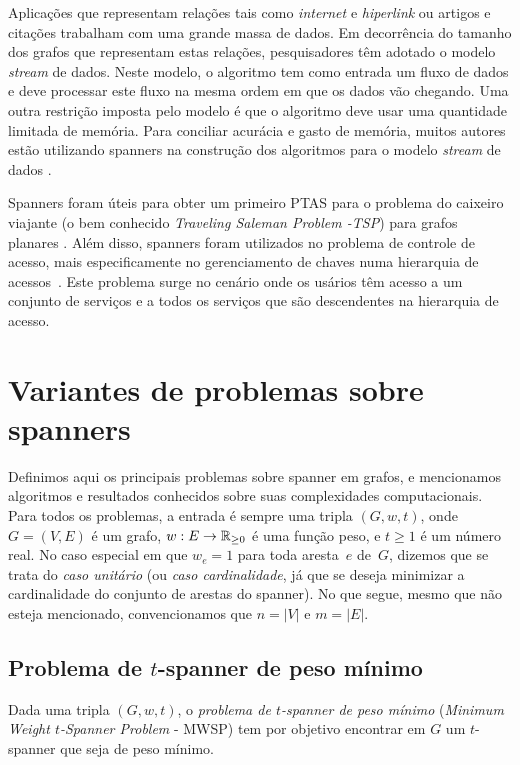 Aplicações que representam relações tais como \emph{internet} e \emph{hiperlink} ou artigos e citações trabalham com uma grande massa de dados.  Em decorrência do tamanho dos grafos que representam estas relações, pesquisadores têm adotado o modelo \emph{stream} de dados. Neste modelo, o algoritmo tem como entrada um fluxo de dados e deve processar este fluxo na mesma ordem em que os dados vão chegando. Uma outra restrição imposta pelo modelo é que o algoritmo deve usar uma quantidade limitada de memória. Para conciliar acurácia e gasto de memória, muitos autores estão utilizando spanners na construção dos algoritmos para o modelo \emph{stream} de dados \cite{AhnGM2012,CrouchMS2013,McGregor2014,KapralovW2014,ElkinS2016,
  BeckerKKL2017}.

Spanners foram úteis para obter um primeiro PTAS para o problema do caixeiro viajante (o bem conhecido \emph{Traveling Saleman Problem -TSP})
para grafos planares \cite{Klein2006}.
Além disso, spanners foram utilizados no problema de controle de acesso, mais especificamente no gerenciamento de chaves numa hierarquia de acessos~\cite{AtallahBFF2009,BhattacharyyaGJRW2009}.  Este problema surge no cenário onde os usários têm acesso a um conjunto de serviços e a todos os serviços que são descendentes na hierarquia de acesso.

\section{Variantes de problemas sobre spanners}

Definimos aqui os principais problemas sobre spanner em grafos, e mencionamos algoritmos e resultados conhecidos sobre suas complexidades computacionais.  Para todos os problemas, a entrada é sempre uma tripla $(G,w,t)$, onde $G=(V,E)$ é um grafo, $w: E \to \mathbb{R}_{\ge 0}$ é uma função peso, e $t \ge 1$ é um número real.  No caso especial em que $w_e=1$ para toda aresta~$e$ de~$G$, dizemos que se trata do \emph{caso unitário} (ou \emph{caso cardinalidade}, já que se deseja minimizar a cardinalidade do conjunto de arestas do spanner). No que segue, mesmo que não esteja mencionado, convencionamos que $n=|V|$ e $m=|E|$.

\subsection{Problema de $t$-spanner de peso mínimo}
\label{sec:comp_spanner_peso_min}

Dada uma tripla $(G,w,t)$, o \emph{problema de $t$-spanner de peso mínimo} (\emph{Minimum Weight $t$-Spanner Problem} - MWSP) tem por objetivo encontrar em $G$ um $t$-spanner que seja de peso mínimo.

